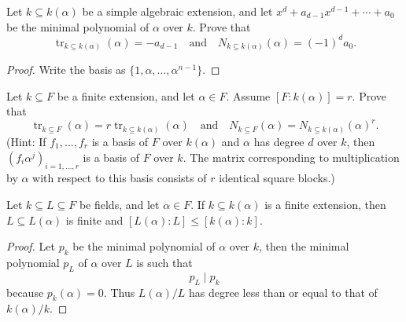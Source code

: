 \documentclass[openany]{book}
\begin{document}
\begin{prob}
Let \( k \subseteq k(\alpha) \) be a simple algebraic extension, and let \( x^d + a_{d-1}x^{d-1} + \cdots + a_0 \) be the minimal polynomial of \( \alpha \) over \( k \). Prove that
\[ \operatorname{tr}_{k \subseteq k(\alpha)}(\alpha) = -a_{d-1} \quad \text{and} \quad N_{k \subseteq k(\alpha)}(\alpha) = (-1)^d a_0. \]
\end{prob}
\begin{proof}
    Write the basis as $\{1,\alpha,\dots, \alpha^{n-1}\}$.
\end{proof}

\begin{prob}
Let \( k \subseteq F \) be a finite extension, and let \( \alpha \in F \). Assume \([F : k(\alpha)] = r\). Prove that
\[ \operatorname{tr}_{k \subseteq F}(\alpha) = r \operatorname{tr}_{k \subseteq k(\alpha)}(\alpha) \quad \text{and} \quad N_{k \subseteq F}(\alpha) = N_{k \subseteq k(\alpha)}(\alpha)^r. \]
(Hint: If \( f_1, \ldots, f_r \) is a basis of \( F \) over \( k(\alpha) \) and \( \alpha \) has degree \( d \) over \( k \), then \( (f_i \alpha^j)_{i=1,\ldots,r} \) is a basis of \( F \) over \( k \). The matrix corresponding to multiplication by \( \alpha \) with respect to this basis consists of \( r \) identical square blocks.)
\end{prob}



\begin{prob}
Let \( k \subseteq L \subseteq F \) be fields, and let \( \alpha \in F \). If \( k \subseteq k(\alpha) \) is a finite extension, then \( L \subseteq L(\alpha) \) is finite and \([L(\alpha) : L] \leq [k(\alpha) : k]\).
\end{prob}
\begin{proof}
    Let $p_k$ be the minimal polynomial of $\alpha$ over $k$, then the minimal polynomial $p_L$ of $\alpha$ over $L$ is such that 
    \begin{equation*}
        p_L \mid p_k
    \end{equation*}
    because $p_k(\alpha)=0$. Thus $L(\alpha)/L$ has degree less than or equal to that of $k(\alpha)/k$.
\end{proof}

\end{document}

